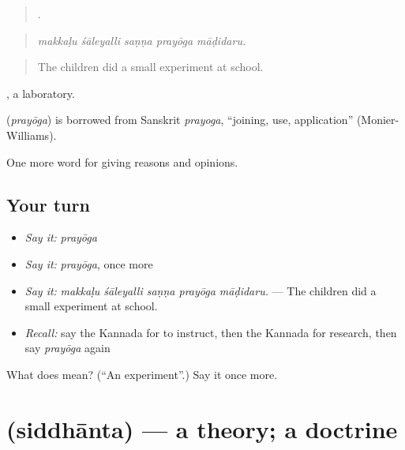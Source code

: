\begin{quote}
    .
\end{quote}

\begin{quote}
\emph{makkaḷu śāleyalli saṇṇa prayōga māḍidaru.}
\end{quote}

\begin{quote}
The children did a small experiment at school.
\end{quote}

, a laboratory.

\begin{cousinweb}
\textbf{} (\emph{prayōga}) is borrowed from Sanskrit \emph{prayoga}, \textquotedblleft{}joining, use, application\textquotedblright{} (Monier-Williams).
\end{cousinweb}

\begin{grammarlens}[title={What you've built}]
One more word for giving reasons and opinions.
\end{grammarlens}

\subsection*{Your turn}
\begin{itemize}
\raggedright
  \item \emph{Say it:} \emph{prayōga}
  \item \emph{Say it:} \emph{prayōga}, once more
  \item \emph{Say it:} \emph{makkaḷu śāleyalli saṇṇa prayōga māḍidaru.} — The children did a small experiment at school.
  \item \emph{Recall:} say the Kannada for to instruct, then the Kannada for research, then say \emph{prayōga} again
\end{itemize}

\begin{tcolorbox}[breakable,colback=teal!4,colframe=teal!35!black,title={Before you move on}]
What does  mean? (\textquotedblleft{}An experiment\textquotedblright{}.) Say it once more.
\end{tcolorbox}
\section[\texorpdfstring{\kn{ಸಿದ್ಧಾಂತ} (siddhānta)}{ಸಿದ್ಧಾಂತ (siddhānta)}]{ (siddhānta) — a theory; a doctrine}

